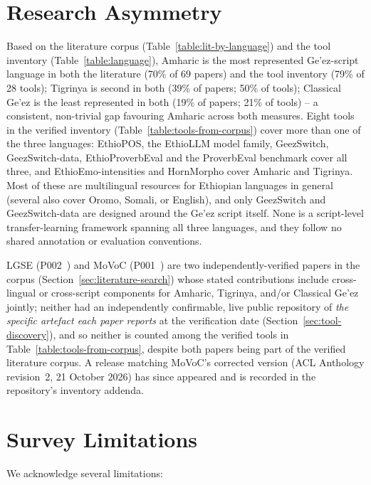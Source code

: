 \documentclass[sn-mathphys-num]{sn-jnl}
\theoremstyle{thmstyleone}
\theoremstyle{thmstyletwo}
\theoremstyle{thmstylethree}
\begin{document}
\section{Research Asymmetry}\label{sec:asymmetry}

Based on the literature corpus (Table~\ref{table:lit-by-language}) and the tool inventory (Table~\ref{table:language}), Amharic is the most represented Ge'ez-script language in both the literature (70\% of 69 papers) and the tool inventory (79\% of 28 tools); Tigrinya is second in both (39\% of papers; 50\% of tools); Classical Ge'ez is the least represented in both (19\% of papers; 21\% of tools) -- a consistent, non-trivial gap favouring Amharic across both measures. Eight tools in the verified inventory (Table~\ref{table:tools-from-corpus}) cover more than one of the three languages: EthioPOS, the EthioLLM model family, GeezSwitch, GeezSwitch-data, EthioProverbEval and the ProverbEval benchmark cover all three, and EthioEmo-intensities and HornMorpho cover Amharic and Tigrinya. Most of these are multilingual resources for Ethiopian languages in general (several also cover Oromo, Somali, or English), and only GeezSwitch and GeezSwitch-data are designed around the Ge'ez script itself. None is a script-level transfer-learning framework spanning all three languages, and they follow no shared annotation or evaluation conventions.

LGSE (P002~\citep{teklehaymanot_lgse_2026}) and MoVoC (P001~\citep{teklehaymanot_movoc_2025}) are two independently-verified papers in the corpus (Section~\ref{sec:literature-search}) whose stated contributions include cross-lingual or cross-script components for Amharic, Tigrinya, and/or Classical Ge'ez jointly; neither had an independently confirmable, live public repository of \emph{the specific artefact each paper reports} at the verification date (Section~\ref{sec:tool-discovery}), and so neither is counted among the verified tools in Table~\ref{table:tools-from-corpus}, despite both papers being part of the verified literature corpus. A release matching MoVoC's corrected version (ACL Anthology revision~2, 21 October 2026) has since appeared and is recorded in the repository's inventory addenda.

\section{Survey Limitations}\label{sec:limitations}

We acknowledge several limitations:
\end{document}
